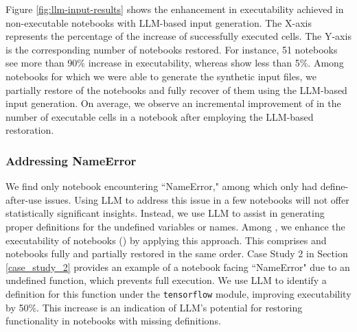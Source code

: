 


    Figure \ref{fig:llm-input-results} shows the enhancement in executability achieved in non-executable notebooks with LLM-based input generation. The X-axis represents the percentage of the increase of successfully executed cells. The Y-axis is the corresponding number of notebooks restored. For instance, 51 notebooks see more than 90\% increase in executability, whereas \totalFileNotFoundLessFivePercent show less than 5\%. Among notebooks for which we were able to generate the synthetic input files, we partially restore \percentFileNotFoundPartiallyRestoredInSuccessfullyGenerated of the notebooks and fully recover \percentFileNotFoundFullyRestoredInSuccessfullyGenerated of them using the LLM-based input generation. On average, we observe an incremental improvement of \avgIncreaseAfterFileFixed in the number of executable cells in a notebook after employing the LLM-based restoration.

        
\subsubsection{Addressing NameError}
   We find only \totalNameError notebook encountering ``NameError," among which only \totalDefinedAfter had define-after-use issues. Using LLM to address this issue in a few notebooks will not offer statistically significant insights. Instead, we use LLM to assist in generating proper definitions for the undefined variables or names. Among \totalNameError, we enhance the executability of \totalNameErrorFixed notebooks (\percentNameErrorFixedInAllNameErrors) by applying this approach. This comprises \percentNameErrorFixedFullInAllNameErrors and \percentNameErrorFixedPartialInAllNameErrors notebooks fully and partially restored in the same order. Case Study 2 in Section \ref{case_study_2} provides an example of a notebook facing ``NameError" due to an undefined function, which prevents full execution. We use LLM to identify a definition for this function under the {\small{\texttt{tensorflow}}} module, improving executability by 50\%. This increase is an indication of LLM's potential for restoring functionality in notebooks with missing definitions.

